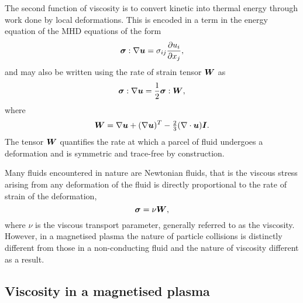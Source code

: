 The second function of viscosity is to convert kinetic into thermal energy through work done by local deformations. This is encoded in a term in the energy equation of the MHD equations of the form
\begin{equation}
  \label{eq:viscous_heat_generation}
  {\bm \sigma} : \nabla {\bm u} = \sigma_{ij} \frac{\partial u_i}{\partial x_j},
\end{equation}
and may also be written using the rate of strain tensor ${\bm W}$ as
\begin{equation}
  \label{eq:viscous_heat_generation2}
  {\bm \sigma} : \nabla {\bm u} = \frac{1}{2} {\bm \sigma} : {\bm W},
\end{equation}
where
\begin{equation}
  \label{eq:rate_of_strain}
  {\bm W} = \nabla{\bm u} + (\nabla{\bm u})^T - \tfrac{2}{3}(\nabla \cdot {\bm u}){\bm I}.
\end{equation}
The tensor ${\bm W}$ quantifies the rate at which a parcel of fluid undergoes a deformation and is symmetric and trace-free by construction.

Many fluids encountered in nature are Newtonian fluids, that is the viscous stress arising from any deformation of the fluid is directly proportional to the rate of strain of the deformation,
\begin{equation}
  \label{eq:isotropic_viscous_tensor}
  {\bm \sigma} = \nu {\bm W},
\end{equation}
where $\nu$ is the viscous transport parameter, generally referred to as the viscosity. However, in a magnetised plasma the nature of particle collisions is distinctly different from those in a non-conducting fluid and the nature of viscosity different as a result.

\subsection{Viscosity in a magnetised plasma}

\label{sec:visc_in_magnetised_plasma}


